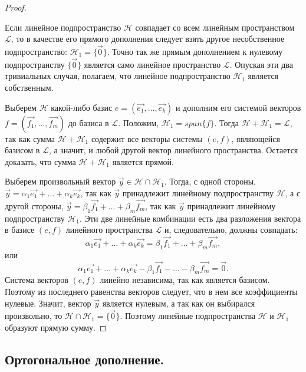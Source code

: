 \begin{proof}~

    Если линейное подпространство $\mathcal{H}$  совпадает со всем линейным пространством $\mathcal{L}$, то в качестве его прямого дополнения следует взять другое несобственное подпространство: $\mathcal{H}_1 = \{\vec{0}\}$. Точно так же прямым дополнением к нулевому подпространству $\{\vec{0}\}$ является само линейное пространство $\mathcal{L}$. Опуская эти два тривиальных случая, полагаем, что линейное подпространство $\mathcal{H}_1$ является собственным.

    Выберем $\mathcal{H}$ какой-либо базис $e = (\vec{e_1}, \ldots, \vec{e_k})$ и дополним его системой векторов $f = (\vec{f_1}, \ldots, \vec{f_m})$ до базиса в $\mathcal{L}$. Положим, $\mathcal{H}_1 = span\{f\}$. Тогда $\mathcal{H} + \mathcal{H}_1 = \mathcal{L}$, так как сумма $\mathcal{H} + \mathcal{H}_1$ содержит все векторы системы $(e, f)$, являющейся базисом в $\mathcal{L}$, а значит, и любой другой вектор линейного пространства. Остается доказать, что сумма $\mathcal{H} + \mathcal{H}_1$ является прямой.

    Выберем произвольный вектор $\vec{y} \in \mathcal{H} \cap \mathcal{H}_1$. Тогда, с одной стороны, $\vec{y} = \alpha_1\vec{e_1} + \ldots + \alpha_k\vec{e_k}$, так как $\vec{y}$ принадлежит линейному подпространству $\mathcal{H}$, а с другой стороны, $\vec{y} = \beta_1\vec{f_1} + \ldots + \beta_m\vec{f_m}$, так как $\vec{y}$ принадлежит линейному подпространству $\mathcal{H}_1$. Эти две линейные комбинации есть два разложения вектора в базисе $(e, f)$ линейного пространства $\mathcal{L}$ и, следовательно, должны совпадать:
    $$\alpha_1\vec{e_1} + \ldots + \alpha_k\vec{e_k} = \beta_1\vec{f_1} + \ldots + \beta_m\vec{f_m},$$
    или
    $$\alpha_1\vec{e_1} + \ldots + \alpha_k\vec{e_k} - \beta_1\vec{f_1} - \ldots - \beta_m\vec{f_m} = \vec{0}.$$
    Система векторов $(e, f)$ линейно независима, так как является базисом. Поэтому из последнего равенства векторов следует, что в нем все коэффициенты нулевые. Значит, вектор $\vec{y}$ является нулевым, а так как он выбирался произвольно, то $\mathcal{H} \cap \mathcal{H}_1 = \{\vec{0}\}$. Поэтому линейные подпространства $\mathcal{H}$ и $\mathcal{H}_1$ образуют прямую сумму.
\end{proof}


\newpage


\subsection{
    Ортогональное дополнение.
}

